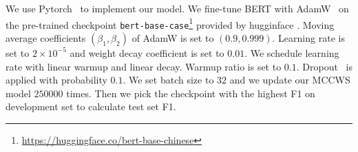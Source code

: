 \documentclass[11pt]{article}
\begin{document}


We use Pytorch~\cite{paszke-etal-2019-pytorch} to implement our model.
We fine-tune BERT with AdamW~\cite{loshchilov2018decoupled} on the pre-trained checkpoint \texttt{bert-base-case}\footnote{\url{https://huggingface.co/bert-base-chinese}} provided by hugginface \cite{wolf2019huggingface}.
Moving average coefficients \((\beta_1, \beta_2)\) of AdamW is set to \((0.9, 0.999)\).
Learning rate is set to \(2 \times 10^{-5}\) and weight decay coefficient is set to \(0.01\).
We schedule learning rate with linear warmup and linear decay.
Warmup ratio is set to \(0.1\).
Dropout~\cite{srivastava2014dropout} is applied with probability \(0.1\).
We set batch size to \(32\) and we update our MCCWS model \(250000\) times.
Then we pick the checkpoint with the highest F1 on development set to calculate test set F1.
\end{document}
